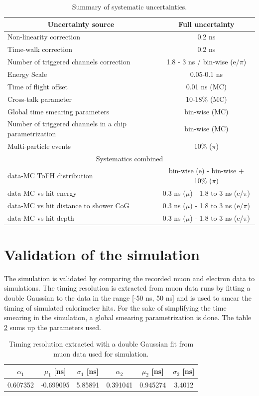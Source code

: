 \begin{table}[htb!]
	\centering
	\caption{Summary of systematic uncertainties.}
	\label{table:time_syst}
	\begin{tabular}{@{} lc @{}}
		\toprule
		\multicolumn{1}{c}{Uncertainty source} & Full uncertainty \\
		\midrule
		Non-linearity correction & 0.2 ns \\
		Time-walk correction & 0.2 ns \\
		Number of triggered channels correction & 1.8 - 3 ns / bin-wise (e/$\pi$)\\
		Energy Scale & 0.05-0.1 ns \\
		Time of flight offset & 0.01 ns (MC) \\
		Cross-talk parameter & 10-18\% (MC)\\
		Global time smearing parameters & bin-wise (MC)\\
		Number of triggered channels in a chip parametrization & bin-wise (MC)\\
		Multi-particle events & 10\% ($\pi$) \\
		\midrule
		\midrule
		\multicolumn{2}{c}{Systematics combined} \\
		\midrule
		data-MC ToFH distribution & bin-wise (e) - bin-wise + 10\% ($\pi$) \\
		data-MC vs hit energy & 0.3 ns ($\mu$) - 1.8 to 3 ns (e/$\pi$)\\
		data-MC vs hit distance to shower CoG & 0.3 ns ($\mu$) - 1.8 to 3 ns (e/$\pi$)\\
		data-MC vs hit depth & 0.3 ns ($\mu$) - 1.8 to 3 ns (e/$\pi$)\\
		\bottomrule
	\end{tabular}
\end{table}

\section{Validation of the simulation}

The simulation is validated by comparing the recorded muon and electron data to simulations. The timing resolution is extracted from muon data runs by fitting a double Gaussian to the data in the range [-50 ns, 50 ns] and is used to smear the timing of simulated calorimeter hits. For the sake of simplifying the time smearing in the simulation, a global smearing parametrization is done. The table \ref{table:time_res_sim} sums up the parameters used.

\begin{table}[htb!]
	\centering
	\caption{Timing resolution extracted with a double Gaussian fit from muon data used for simulation.}
	\label{table:time_res_sim}
	\begin{tabular}{@{} cccccc @{}}
		\toprule
		$\alpha_{1}$ & $\mu_{1}$ [ns] & $\sigma_{1}$ [ns] & $\alpha_{2}$ & $\mu_{2}$ [ns] & $\sigma_{2}$ [ns] \\
		\midrule
		0.607352 & -0.699095 & 5.85891 & 0.391041 & 0.945274 & 3.4012 \\
		\bottomrule
	\end{tabular}
\end{table}

